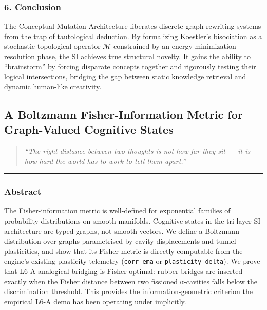 \documentclass[
  11pt,
  a4paper,
]{article}
\begin{document}
\subsubsection{6. Conclusion}\label{conclusion-3}

The Conceptual Mutation Architecture liberates discrete graph-rewriting
systems from the trap of tautological deduction. By formalizing
Koestler's bisociation as a stochastic topological operator
\(\mathcal{M}\) constrained by an energy-minimization resolution phase,
the SI achieves true structural novelty. It gains the ability to
``brainstorm'' by forcing disparate concepts together and rigorously
testing their logical intersections, bridging the gap between static
knowledge retrieval and dynamic human-like creativity.

\newpage

\subsection{A Boltzmann Fisher-Information Metric for Graph-Valued
Cognitive
States}\label{a-boltzmann-fisher-information-metric-for-graph-valued-cognitive-states}

\begin{quote}
\emph{``The right distance between two thoughts is not how far they sit
--- it is how hard the world has to work to tell them apart.''}
\end{quote}

\begin{center}\rule{0.5\linewidth}{0.5pt}\end{center}

\subsubsection{Abstract}\label{abstract-4}

The Fisher-information metric is well-defined for exponential families
of probability distributions on smooth manifolds. Cognitive states in
the tri-layer SI architecture are typed graphs, not smooth vectors. We
define a Boltzmann distribution over graphs parametrised by cavity
displacements and tunnel plasticities, and show that its Fisher metric
is directly computable from the engine's existing plasticity telemetry
(\texttt{corr\_ema} or \texttt{plasticity\_delta}). We prove that L6-A
analogical bridging is Fisher-optimal: rubber bridges are inserted
exactly when the Fisher distance between two fissioned α-cavities falls
below the discrimination threshold. This provides the
information-geometric criterion the empirical L6-A demo has been
operating under implicitly.
\end{document}
